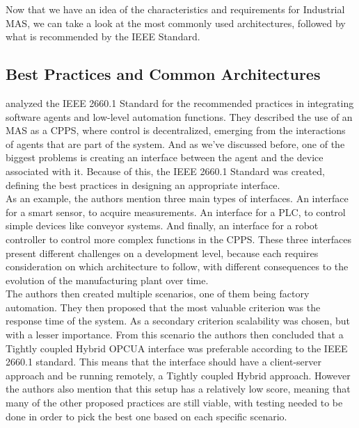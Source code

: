 Now that we have an idea of the characteristics and requirements for Industrial \acrshort{MAS}, we can take a look at the most commonly used architectures, followed by what is recommended by the IEEE Standard.

\subsection{Best Practices and Common Architectures}
\label{subsec:best_practices_and_common_architectures}

\citeauthor{Leitao2021} \cite{Leitao2021} analyzed the IEEE 2660.1 Standard for the recommended practices in integrating software agents and low-level automation functions. They described the use of an \acrshort{MAS} as a \acrshort{CPPS}, where control is decentralized, emerging from the interactions of agents that are part of the system. And as we've discussed before, one of the biggest problems is creating an interface between the agent and the device associated with it. Because of this, the IEEE 2660.1 Standard was created, defining the best practices in designing an appropriate interface.\\

As an example, the authors mention three main types of interfaces. An interface for a smart sensor, to acquire measurements. An interface for a \acrshort{PLC}, to control simple devices like conveyor systems. And finally, an interface for a robot controller to control more complex functions in the \acrshort{CPPS}. These three interfaces present different challenges on a development level, because each requires consideration on which architecture to follow, with different consequences to the evolution of the manufacturing plant over time.\\

The authors then created multiple scenarios, one of them being factory automation. They then proposed that the most valuable criterion was the response time of the system. As a secondary criterion scalability was chosen, but with a lesser importance. From this scenario the authors then concluded that a Tightly coupled Hybrid \acrshort{OPCUA} interface was preferable according to the IEEE 2660.1 standard. This means that the interface should have a client-server approach and be running remotely, a Tightly coupled Hybrid approach. However the authors also mention that this setup has a relatively low score, meaning that many of the other proposed practices are still viable, with testing needed to be done in order to pick the best one based on each specific scenario.\\


